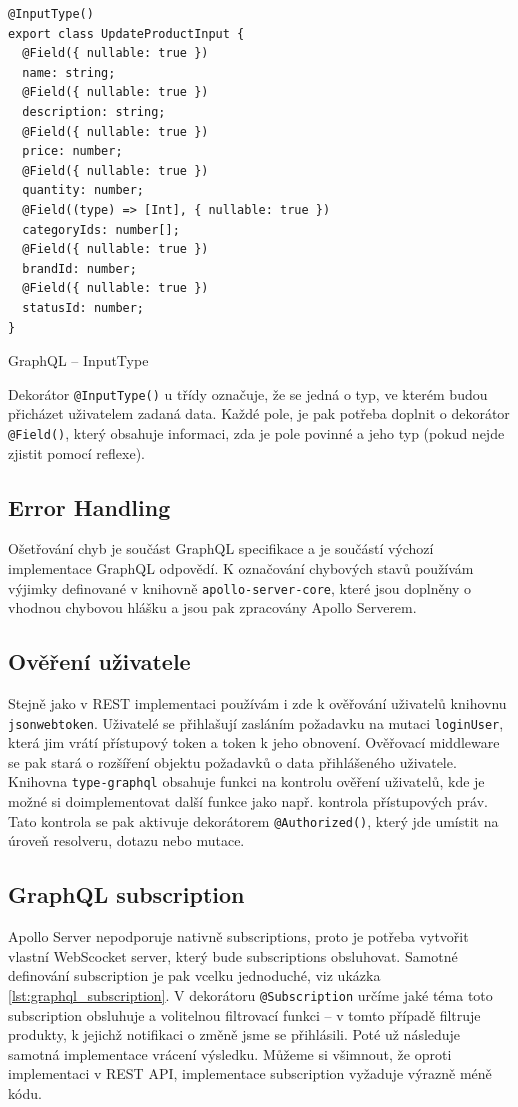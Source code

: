 \documentclass[thesis=M,czech]{FITthesis}[2019/12/23]
\begin{document}
\begin{listing}[H]
\begin{verbatim}
@InputType()
export class UpdateProductInput {
  @Field({ nullable: true })
  name: string;
  @Field({ nullable: true })
  description: string;
  @Field({ nullable: true })
  price: number;
  @Field({ nullable: true })
  quantity: number;
  @Field((type) => [Int], { nullable: true })
  categoryIds: number[];
  @Field({ nullable: true })
  brandId: number;
  @Field({ nullable: true })
  statusId: number;
}
\end{verbatim}
\caption{GraphQL -- InputType}
\label{lst:graphql_inputtype}
\end{listing}

Dekorátor \texttt{@InputType()} u třídy označuje, že se jedná o typ, ve kterém budou přicházet uživatelem zadaná data. Každé pole, je pak potřeba doplnit o dekorátor \texttt{@Field()}, který obsahuje informaci, zda je pole povinné a jeho typ (pokud nejde zjistit pomocí reflexe).

\subsection{Error Handling}
Ošetřování chyb je součást GraphQL specifikace a je součástí výchozí implementace GraphQL odpovědí. K označování chybových stavů používám výjimky definované v knihovně \texttt{apollo-server-core}, které jsou doplněny o vhodnou chybovou hlášku a jsou pak zpracovány Apollo Serverem.

\subsection{Ověření uživatele}
Stejně jako v REST implementaci používám i zde k ověřování uživatelů knihovnu \texttt{jsonwebtoken}. Uživatelé se přihlašují zasláním požadavku na mutaci \texttt{loginUser}, která jim vrátí přístupový token a token k jeho obnovení. Ověřovací middleware se pak stará o rozšíření objektu požadavků o data přihlášeného uživatele. Knihovna \texttt{type-graphql} obsahuje funkci na kontrolu ověření uživatelů, kde je možné si doimplementovat další funkce jako např. kontrola přístupových práv. Tato kontrola se pak aktivuje dekorátorem \texttt{@Authorized()}, který jde umístit na úroveň resolveru, dotazu nebo mutace.

\subsection{GraphQL subscription}
Apollo Server nepodporuje nativně subscriptions, proto je potřeba vytvořit vlastní WebScocket server, který bude subscriptions obsluhovat. Samotné definování subscription je pak vcelku jednoduché, viz ukázka \ref{lst:graphql_subscription}. V dekorátoru \texttt{@Subscription} určíme jaké téma toto subscription obsluhuje a volitelnou filtrovací funkci -- v tomto případě filtruje produkty, k jejichž notifikaci o změně jsme se přihlásili. Poté už následuje samotná implementace vrácení výsledku. Můžeme si všimnout, že oproti implementaci v REST API, implementace subscription vyžaduje výrazně méně kódu.
\end{document}
